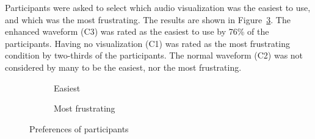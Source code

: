 Participants were asked to select which audio visualization was the easiest to use, and which was the most frustrating.
The results are shown in Figure~\ref{fig:visualization-comparison}.  The enhanced waveform (C3) was rated as the
easiest to use by 76\% of the participants.  Having no visualization (C1) was rated as the most frustrating condition
by two-thirds of the participants. The normal waveform (C2) was not considered by many to be the easiest, nor the most
frustrating.

\begin{figure}[ht]
\centering
\begin{subfigure}{.5\textwidth}
  \centering
  \caption{Easiest}
  \label{fig:easiest}
\end{subfigure}%
\begin{subfigure}{.5\textwidth}
  \centering
  \caption{Most frustrating}
  \label{fig:frustrating}
\end{subfigure}
\caption{Preferences of participants}
\label{fig:visualization-comparison}
\end{figure}



